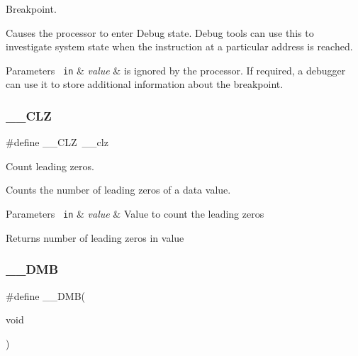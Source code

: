 Breakpoint. 

Causes the processor to enter Debug state. Debug tools can use this to investigate system state when the instruction at a particular address is reached. 
\begin{DoxyParams}[1]{Parameters}
\mbox{\texttt{ in}}  & {\em value} & is ignored by the processor. If required, a debugger can use it to store additional information about the breakpoint. \\
\hline
\end{DoxyParams}
\mbox{\label{group___c_m_s_i_s___core___instruction_interface_ga5d5bb1527e042be4a9fa5a33f65cc248}} 
\subsubsection{\texorpdfstring{\_\_CLZ}{\_\_CLZ}}
{\footnotesize\ttfamily \#define \+\_\+\+\_\+\+C\+LZ~\+\_\+\+\_\+clz}



Count leading zeros. 

Counts the number of leading zeros of a data value. 
\begin{DoxyParams}[1]{Parameters}
\mbox{\texttt{ in}}  & {\em value} & Value to count the leading zeros \\
\hline
\end{DoxyParams}
\begin{DoxyReturn}{Returns}
number of leading zeros in value 
\end{DoxyReturn}
\mbox{\label{group___c_m_s_i_s___core___instruction_interface_ga671101179b5943990785f36f8c1e2269}} 
\subsubsection{\texorpdfstring{\_\_DMB}{\_\_DMB}\hspace{0.1cm}{\footnotesize\ttfamily [1/3]}}
{\footnotesize\ttfamily \#define \+\_\+\+\_\+\+D\+MB(\begin{DoxyParamCaption}\item[{}]{void }\end{DoxyParamCaption})}

